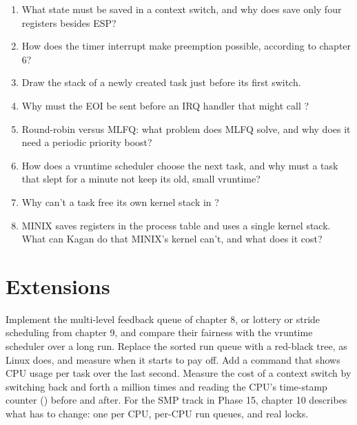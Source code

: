 \documentclass[11pt,a4paper]{article}
\begin{document}
\begin{questionbox}
\begin{enumerate}
  \item What state must be saved in a context switch, and why does  save only four registers besides ESP?
  \item How does the timer interrupt make preemption possible, according to \OSTEP chapter 6?
  \item Draw the stack of a newly created task just before its first switch.
  \item Why must the EOI be sent before an IRQ handler that might call ?
  \item Round-robin versus MLFQ: what problem does MLFQ solve, and why does it need a periodic priority boost?
  \item How does a vruntime scheduler choose the next task, and why must a task that slept for a minute not keep its old, small vruntime?
  \item Why can't a task free its own kernel stack in ?
  \item MINIX saves registers in the process table and uses a single kernel stack. What can Kagan do that MINIX's kernel can't, and what does it cost?
\end{enumerate}
\end{questionbox}

\section{Extensions}

Implement the multi-level feedback queue of \OSTEP chapter 8, or lottery or stride scheduling from chapter 9, and
compare their fairness with the vruntime scheduler over a long run. Replace the sorted run queue with a red-black
tree, as Linux does, and measure when it starts to pay off. Add a 
command that shows CPU usage per task over the last second. Measure the cost of a context switch by switching back and
forth a million times and reading the CPU's time-stamp counter () before and after. For the SMP track in
Phase 15, \OSTEP chapter 10 describes what has to change: one  per CPU,
per-CPU run queues, and real locks.

\booklegend
\end{document}
